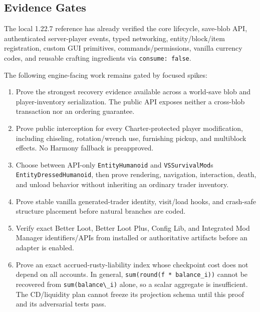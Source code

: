 \documentclass[
  9pt,
  letterpaper,
]{extarticle}
\newcommand{\passthrough}[1]{#1}
\providecommand{\tightlist}{%
  \setlength{\itemsep}{0pt}\setlength{\parskip}{0pt}}
\begin{document}
\subsection{Evidence Gates}\label{evidence-gates}

The local 1.22.7 reference has already verified the core lifecycle,
save-blob API, authenticated server-player events, typed networking,
entity/\allowbreak{}block/\allowbreak{}item registration, custom GUI
primitives, commands/permissions, vanilla currency codes, and reusable
crafting ingredients via \passthrough{\lstinline!consume: false!}.

The following engine-facing work remains gated by focused spikes:

\begin{enumerate}
\def\labelenumi{\arabic{enumi}.}
\tightlist
\item
  Prove the strongest recovery evidence available across a world-save
  blob and player-inventory serialization. The public API exposes
  neither a cross-blob transaction nor an ordering guarantee.
\item
  Prove public interception for every Charter-protected player
  modification, including chiseling, rotation/wrench use, furnishing
  pickup, and multiblock effects. No Harmony fallback is preapproved.
\item
  Choose between API-only \passthrough{\lstinline!EntityHumanoid!} and
  \passthrough{\lstinline!VSSurvivalMod!}\textquotesingle s
  \passthrough{\lstinline!EntityDressedHumanoid!}, then prove rendering,
  navigation, interaction, death, and unload behavior without inheriting
  an ordinary trader inventory.
\item
  Prove stable vanilla generated-trader identity, visit/load hooks, and
  crash-safe structure placement before natural branches are coded.
\item
  Verify exact Better Loot, Better Loot Plus, Config Lib, and Integrated
  Mod Manager identifiers/APIs from installed or authoritative artifacts
  before an adapter is enabled.
\item
  Prove an exact accrued-rusty-liability index whose checkpoint cost
  does not depend on all accounts. In general,
  \texttt{sum(}\allowbreak{}\texttt{round(}\allowbreak{}\texttt{f\ }\allowbreak{}\texttt{*\ }\allowbreak{}\texttt{balance\_}\allowbreak{}\texttt{i)}\allowbreak{}\texttt{)}\allowbreak{}
  cannot be recovered from \passthrough{\lstinline!sum(balance\_i)!}
  alone, so a scalar aggregate is insufficient. The CD/liquidity plan
  cannot freeze its projection schema until this proof and its
  adversarial tests pass.
\end{enumerate}
\end{document}
